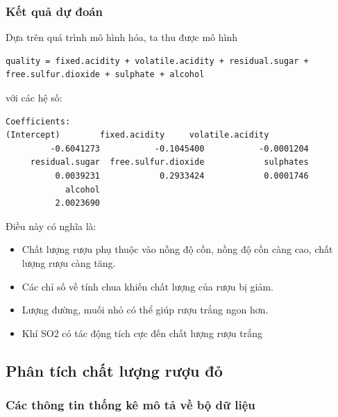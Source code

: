 \subsubsection{Kết quả dự đoán}

Dựa trên quá trình mô hình hóa, ta thu được mô hình

\begin{lstlisting}
quality = fixed.acidity + volatile.acidity + residual.sugar + free.sulfur.dioxide + sulphate + alcohol
\end{lstlisting}

với các hệ số:

\begin{lstlisting}
Coefficients:
(Intercept)        fixed.acidity     volatile.acidity  
         -0.6041273           -0.1045400           -0.0001204  
     residual.sugar  free.sulfur.dioxide            sulphates  
          0.0039231            0.2933424            0.0001746  
            alcohol  
          2.0023690 
\end{lstlisting}

Điều này có nghĩa là:
\begin{itemize}
    \item Chất lượng rượu phụ thuộc vào nồng độ cồn, nồng độ cồn càng cao, chất lượng rượu càng tăng.
    \item Các chỉ số về tính chua khiến chất lượng của rượu bị giảm.
    \item  Lượng đường, muối nhỏ có thể giúp rượu trắng ngon hơn.
    \item Khí SO2 có tác động tích cực đến chất lượng rượu trắng
\end{itemize}


\subsection{Phân tích chất lượng rượu đỏ}

\subsubsection{Các thông tin thống kê mô tả về bộ dữ liệu}

